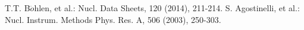\documentclass[a4paper, 10pt, twocolumn]{article}
\begin{document}
\begin{thebibliography}{10}
	 T.T. B$\ddot{o}$hlen, et al.: Nucl. Data Sheets, 120 (2014), 211-214.
	 S. Agostinelli, et al.: Nucl. Instrum. Methods Phys. Res. A, 506 (2003), 250-303.
\end{thebibliography}
\end{document}
